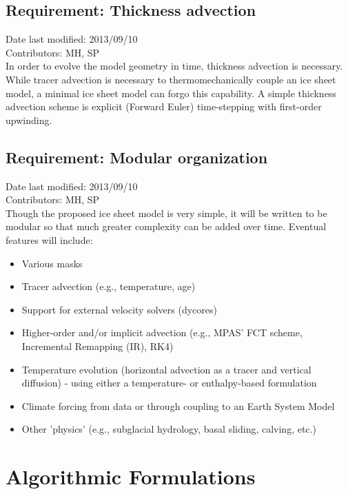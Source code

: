 \documentclass[11pt]{report}
\begin{document}
\section{Requirement: Thickness advection}
Date last modified: 2013/09/10 \\
Contributors: MH, SP \\

In order to evolve the model geometry in time, thickness advection is necessary.  While tracer advection is necessary to thermomechanically couple an ice sheet model, a minimal ice sheet model can forgo this capability.  A simple thickness advection scheme is explicit (Forward Euler) time-stepping with first-order upwinding.


\section{Requirement: Modular organization}
Date last modified: 2013/09/10 \\
Contributors: MH, SP \\

Though the proposed ice sheet model is very simple, it will be written to be modular so that much greater complexity can be added over time.  Eventual features will include:

\begin{itemize}
\item Various masks
\item Tracer advection (e.g., temperature, age)
\item Support for external velocity solvers (dycores)
\item Higher-order and/or implicit advection (e.g., MPAS' FCT scheme, Incremental Remapping (IR), RK4)
\item Temperature evolution (horizontal advection as a tracer and vertical diffusion) - using either a temperature- or enthalpy-based formulation
\item Climate forcing from data or through coupling to an Earth System Model
\item Other 'physics' (e.g., subglacial hydrology, basal sliding, calving, etc.)
\end{itemize}



\chapter{Algorithmic Formulations}
\end{document}
